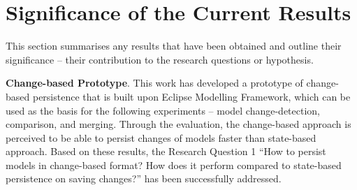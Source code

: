 \documentclass[12pt, a4paper]{report} \usepackage[titletoc]{appendix}
\begin{document}


\section{Significance of the Current Results}
\label{sec:significance_and_contribution_of_current_results}
This section summarises any results that have been obtained and outline their significance -- their contribution to the research questions or hypothesis.

\textbf{Change-based Prototype}. This work has developed a prototype of change-based persistence that is built upon Eclipse Modelling Framework, which can be used as the basis for the following experiments -- model change-detection, comparison, and merging. Through the evaluation, the change-based approach is perceived to be able to persist changes of models faster than state-based approach. Based on these results, the Research Question 1 ``How to persist models in change-based format? How does it perform compared to state-based persistence on saving changes?'' has been successfully addressed.
\end{document}
